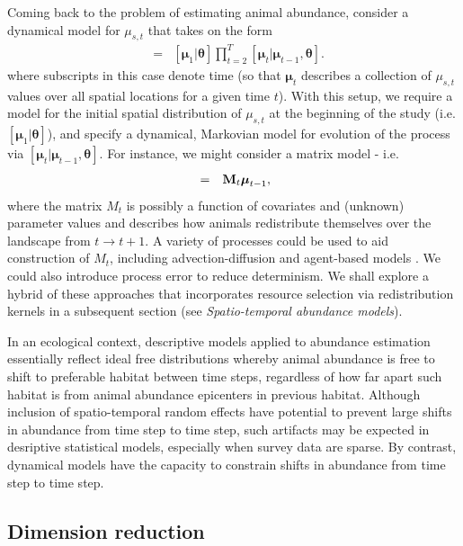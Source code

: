 \documentclass[times,mee,doublespace,]{besauth2}
\begin{document}
Coming back to the problem of estimating animal abundance, consider a dynamical model for $\mu_{s,t}$ that takes on the form
\begin{eqnarray}
  [\boldsymbol{\mu}|\boldsymbol{\theta}] & = & [\boldsymbol{\mu}_1 | \boldsymbol{\theta}] \prod_{t=2}^T [\boldsymbol{\mu}_t | \boldsymbol{\mu}_{t-1},\boldsymbol{\theta}].
  \label{eq:mu}
\end{eqnarray}
where subscripts in this case denote time (so that $\boldsymbol{\mu}_t$ describes a collection of $\mu_{s,t}$ values over all spatial locations for a given time $t$).  With this setup, we require a model for the initial spatial distribution of $\mu_{s,t}$ at the beginning of the study (i.e. $[\boldsymbol{\mu}_1 | \boldsymbol{\theta}]$), and
specify a dynamical, Markovian model for evolution of the process via $[\boldsymbol{\mu}_t | \boldsymbol{\mu}_{t-1},\boldsymbol{\theta}]$.  For instance, we might consider a matrix model - i.e.
\begin{eqnarray}
[\boldsymbol{\mu}_t | \boldsymbol{\mu}_{t-1},\boldsymbol{\theta}] & = & {\bf M}_t  \boldsymbol{\mu}_{t-1},
 \label{eq:matrix-mod}
\end{eqnarray}
where the matrix $M_t$ is possibly a function of covariates and (unknown) parameter values and describes how animals
redistribute themselves over the landscape from $t \rightarrow t+1$.  A variety of processes could be used to aid construction of $M_t$, including advection-diffusion \citep{Wikle2003} and agent-based models \citep{HootenWikle2010}.  We could also introduce process error to reduce determinism.  We shall explore a hybrid of these approaches that incorporates resource selection via redistribution kernels in a subsequent section (see {\it Spatio-temporal abundance models}).

In an ecological context, descriptive models applied to abundance estimation essentially reflect ideal free distributions \citep{FretwellLucas1970} whereby animal abundance is free to shift to preferable habitat between time steps, regardless of how far apart such habitat is from animal abundance epicenters in previous habitat.  Although inclusion of spatio-temporal random effects have potential to prevent large shifts in abundance from time step to time step, such artifacts may be expected in desriptive statistical models, especially when survey data are sparse.  By contrast, dynamical models have the capacity to constrain shifts in abundance from time step to time step.

\subsection{Dimension reduction}
\end{document}

